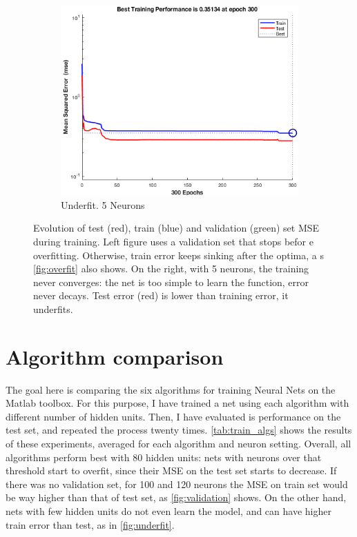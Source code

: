 \documentclass[a4paper, 10pt]{article}
\begin{document}
\begin{figure}[h]
\begin{adjustwidth}{-1.1cm}{-1.1cm}
  \begin{subfigure}[t]{0.3\linewidth}
    \includegraphics[width=1\linewidth]{./lab1/underfit.png}
    \caption{Underfit. 5 Neurons}
    \label{fig:underfit}
  \end{subfigure}
  \end{adjustwidth}
  \caption{Evolution of test (red), train (blue) and validation (green) set 
    MSE during training.  Left figure uses a validation set that stops befor
    e overfitting.  Otherwise, train error keeps sinking after the optima, a
    s \autoref{fig:overfit} also shows. On the right, with 5 neurons, the 
    training never converges: the net is too simple to learn the function, 
    error never decays. Test error (red) is lower than training error, it
    underfits.}
  \label{fig:validation}
\end{figure}


    \section{Algorithm comparison}
    The goal here is comparing the six algorithms for training Neural Nets on
    the Matlab toolbox. For this purpose, I have trained a net using each 
    algorithm with different number of hidden units. Then, I have evaluated
    is performance on the test set, and repeated the process twenty times. 
    \autoref{tab:train_algs} shows the results of these experiments, averaged for
    each algorithm and neuron setting. Overall, all algorithms perform best
    with 80 hidden units: nets with neurons over that threshold 
    start to overfit, since their MSE on the test set starts to decrease. 
    If there was no validation set, for 100 and 120 neurons the MSE on 
    train set would be way higher than that of test set, as
    \autoref{fig:validation} shows. On the other hand, nets with few hidden units
    do not even learn the model, and can have higher train error than test, as in
    \autoref{fig:underfit}.
    
\end{document}
